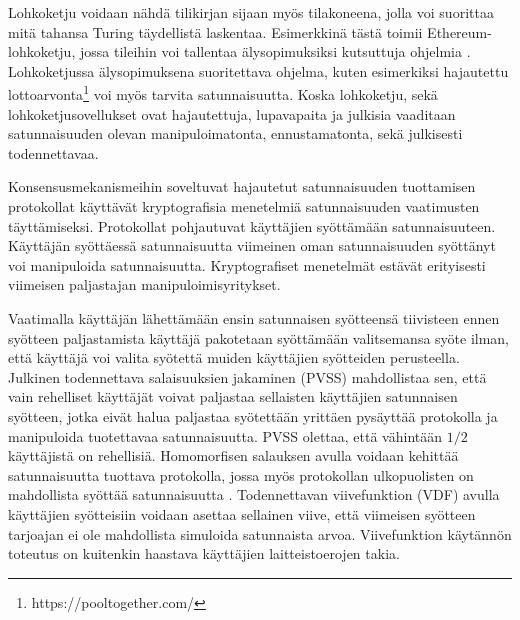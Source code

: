 \documentclass{article}
\begin{document}
Lohkoketju voidaan nähdä tilikirjan sijaan myös tilakoneena, jolla voi suorittaa mitä tahansa Turing täydellistä laskentaa. Esimerkkinä tästä toimii Ethereum-lohkoketju, jossa tileihin voi tallentaa älysopimuksiksi kutsuttuja ohjelmia \cite{buterin_ethereum_2014}. Lohkoketjussa älysopimuksena suoritettava ohjelma, kuten esimerkiksi hajautettu lottoarvonta\footnote{https://pooltogether.com/} voi myös tarvita satunnaisuutta.  
Koska lohkoketju, sekä lohkoketjusovellukset ovat hajautettuja, lupavapaita ja julkisia vaaditaan satunnaisuuden olevan manipuloimatonta, ennustamatonta, sekä julkisesti todennettavaa.

Konsensusmekanismeihin soveltuvat hajautetut satunnaisuuden tuottamisen protokollat käyttävät kryptografisia menetelmiä satunnaisuuden vaatimusten täyttämiseksi. Protokollat pohjautuvat käyttäjien syöttämään satunnaisuuteen. Käyttäjän syöttäessä satunnaisuutta viimeinen oman satunnaisuuden syöttänyt voi manipuloida satunnaisuutta. Kryptografiset menetelmät estävät erityisesti viimeisen paljastajan manipuloimisyritykset.

Vaatimalla käyttäjän lähettämään ensin satunnaisen syötteensä tiivisteen ennen syötteen paljastamista käyttäjä pakotetaan syöttämään valitsemansa syöte ilman, että käyttäjä voi valita syötettä muiden käyttäjien syötteiden perusteella. Julkinen todennettava salaisuuksien jakaminen (PVSS) \cite{StadlerMarkus2001PVSS} mahdollistaa sen, että vain rehelliset käyttäjät voivat paljastaa sellaisten käyttäjien satunnaisen syötteen, jotka eivät halua paljastaa syötettään yrittäen pysäyttää protokolla ja manipuloida tuotettavaa satunnaisuutta. PVSS olettaa, että vähintään $1/2$ käyttäjistä on rehellisiä. Homomorfisen salauksen avulla voidaan kehittää satunnaisuutta tuottava protokolla, jossa myös protokollan ulkopuolisten on mahdollista syöttää satunnaisuutta \cite{cherniaeva2019homomorphic}. Todennettavan viivefunktion (VDF) \cite{boneh_verifiable_2018} avulla käyttäjien syötteisiin voidaan asettaa sellainen viive, että viimeisen syötteen tarjoajan ei ole mahdollista simuloida satunnaista arvoa. Viivefunktion käytännön toteutus on kuitenkin haastava käyttäjien laitteistoerojen takia.
\end{document}
